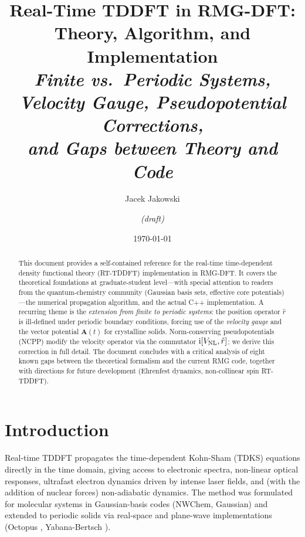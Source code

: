 \documentclass[12pt,letterpaper]{article}
\newcommand{\ii}{\mathrm{i}}
\newcommand{\VNL}{V_{\rm NL}}
\begin{document}
\title{\Large\bfseries Real-Time TDDFT in RMG-DFT:\\
Theory, Algorithm, and Implementation\\[6pt]
\normalsize\textit{Finite vs.\ Periodic Systems, Velocity Gauge,
Pseudopotential Corrections,\\and Gaps between Theory and Code}}

\author{Jacek Jakowski \and \textit{(draft)}}
\date{\today}
\maketitle
\tableofcontents
\newpage

\begin{abstract}
This document provides a self-contained reference for the real-time
time-dependent density functional theory (RT-TDDFT) implementation in
RMG-DFT\@.  It covers the theoretical foundations at graduate-student
level---with special attention to readers from the quantum-chemistry
community (Gaussian basis sets, effective core potentials)---the numerical
propagation algorithm, and the actual C++ implementation.  A recurring theme
is the \emph{extension from finite to periodic systems}: the position operator
$\hat{r}$ is ill-defined under periodic boundary conditions, forcing use of
the \emph{velocity gauge} and the vector potential $\bm{A}(t)$ for crystalline
solids.  Norm-conserving pseudopotentials (NCPP) modify the velocity operator
via the commutator $\ii[\VNL,\hat{r}]$; we derive this correction in full
detail.  The document concludes with a critical analysis of eight known gaps
between the theoretical formalism and the current RMG code, together with
directions for future development (Ehrenfest dynamics, non-collinear spin
RT-TDDFT).
\end{abstract}

\section{Introduction}
\label{sec:intro}

Real-time TDDFT propagates the time-dependent Kohn-Sham (TDKS) equations
directly in the time domain, giving access to electronic spectra, non-linear
optical responses, ultrafast electron dynamics driven by intense laser fields,
and (with the addition of nuclear forces) non-adiabatic dynamics.  The
method was formulated for molecular systems in Gaussian-basis codes
(NWChem, Gaussian) and extended to periodic solids via real-space and
plane-wave implementations (Octopus \cite{Castro2004}, Yabana-Bertsch
\cite{Yabana1996}).
\end{document}
